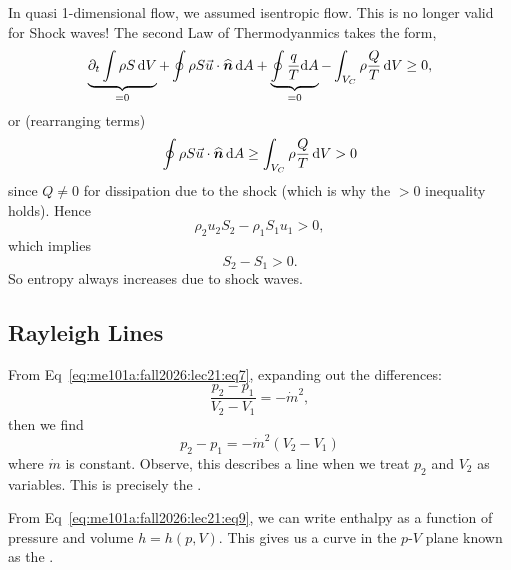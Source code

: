\begin{node}
In quasi 1-dimensional flow, we assumed isentropic flow. This is no
longer valid for Shock waves! The second Law of Thermodyanmics takes
the form,
\begin{equation}
\underbrace{\partial_{t}\int\rho S\,\mathrm{d} V}_{=0}
+ \oint\rho S\vec{u}\cdot\widehat{\boldsymbol{n}}\,\mathrm{d} A
+ \underbrace{\oint\frac{q}{T}\mathrm{d} A}_{=0}
- \int_{V_{C}}\rho\frac{Q}{T}\,\mathrm{d} V\geq0,
\end{equation}
or (rearranging terms)
\begin{equation}
\oint\rho S\vec{u}\cdot\widehat{\boldsymbol{n}}\,\mathrm{d} A\geq\int_{V_{C}}\rho\frac{Q}{T}\,\mathrm{d} V>0
\end{equation}
since $Q\neq0$ for dissipation due to the shock (which is why the $>0$
inequality holds). Hence
\begin{equation}
\rho_{2}u_{2}S_{2}-\rho_{1}S_{1}u_{1}>0,
\end{equation}
which implies
\begin{equation}
S_{2}-S_{1}>0.
\end{equation}
So entropy always increases due to shock waves.
\end{node}

\subsection{Rayleigh Lines}

\begin{node}
From Eq~\eqref{eq:me101a:fall2026:lec21:eq7}, expanding out the differences:
\begin{equation}
\frac{p_{2}-p_{1}}{V_{2}-V_{1}}=-\dot{m}^{2},
\end{equation}
then we find
\begin{equation}
p_{2}-p_{1}=-\dot{m}^{2}(V_{2}-V_{1})
\end{equation}
where $\dot{m}$ is constant. Observe, this describes a line when we
treat $p_{2}$ and $V_{2}$ as variables. This is precisely the
.
\end{node}

\begin{node}
From Eq~\eqref{eq:me101a:fall2026:lec21:eq9},
we can write enthalpy as a function of pressure and volume $h=h(p,V)$.
This gives us a curve in the $p$-$V$ plane known as the
.
\end{node}

